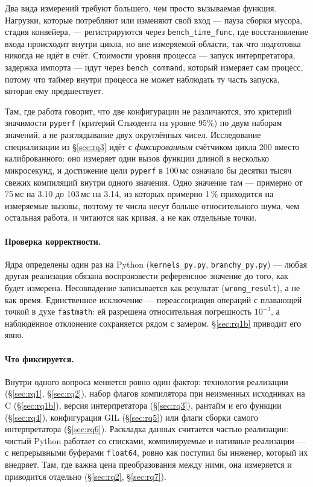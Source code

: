 \documentclass[10pt,a4paper]{article}
\newcommand{\meas}[2]{#2}
\newcommand{\code}[1]{\texttt{\small #1}}
\begin{document}
Два вида измерений требуют большего, чем просто вызываемая функция. Нагрузки, которые потребляют
или изменяют свой вход --- пауза сборки мусора, стадия конвейера, --- регистрируются через
\code{bench\_time\_func}, где восстановление входа происходит внутри цикла, но вне измеряемой
области, так что подготовка никогда не идёт в счёт. Стоимости уровня процесса --- запуск
интерпретатора, задержка импорта --- идут через \code{bench\_command}, который измеряет сам
процесс, потому что таймер внутри процесса не может наблюдать ту часть запуска, которая ему
предшествует.

Там, где работа говорит, что две конфигурации не различаются, это критерий значимости
\code{pyperf} (критерий Стьюдента на уровне 95\%) по двум наборам значений, а не разглядывание
двух округлённых чисел. Исследование специализации из \S\ref{sec:rq3} идёт с
\emph{фиксированным} счётчиком цикла 200 вместо калиброванного: оно измеряет один вызов функции
длиной в несколько микросекунд, и достижение цели \code{pyperf} в 100\,мс означало бы
десятки тысяч свежих компиляций внутри одного значения. Одно значение там --- примерно от \meas{dur:b3_spec-v310:median}{75}\,мс на 3.10 до \meas{dur:b3_spec-v314:median}{103}\,мс на 3.14, из
которых примерно 1\,\% приходится на измеряемые вызовы, поэтому те числа несут больше
относительного шума, чем остальная работа, и читаются как кривая, а не как отдельные точки.

\paragraph{Проверка корректности.}
Ядра определены один раз на Python (\code{kernels\_py.py}, \code{branchy\_py.py}) --- любая другая
реализация обязана воспроизвести референсное значение до того, как будет измерена. Несовпадение
записывается как результат (\code{wrong\_result}), а не как время. Единственное исключение ---
переассоциация операций с плавающей точкой в духе \code{fastmath}: ей разрешена относительная
погрешность $10^{-3}$, а наблюдённое отклонение сохраняется рядом с замером.
\S\ref{sec:rq1b} приводит его явно.

\paragraph{Что фиксируется.}
Внутри одного вопроса меняется ровно один фактор: технология реализации (\S\ref{sec:rq1},
\S\ref{sec:rq2}), набор флагов компилятора при неизменных исходниках на C (\S\ref{sec:rq1b}),
версия интерпретатора (\S\ref{sec:rq3}), рантайм и его функции (\S\ref{sec:rq4}), конфигурация
GIL (\S\ref{sec:rq5}) или флаги сборки самого интерпретатора (\S\ref{sec:rq6}). Раскладка данных
считается частью реализации: чистый Python работает со списками, компилируемые и нативные
реализации --- с непрерывными буферами \code{float64}, ровно как поступил бы инженер, который их
внедряет. Там, где важна цена преобразования между ними, она измеряется и приводится отдельно
(\S\ref{sec:rq2}, \S\ref{sec:rq7}).
\end{document}
